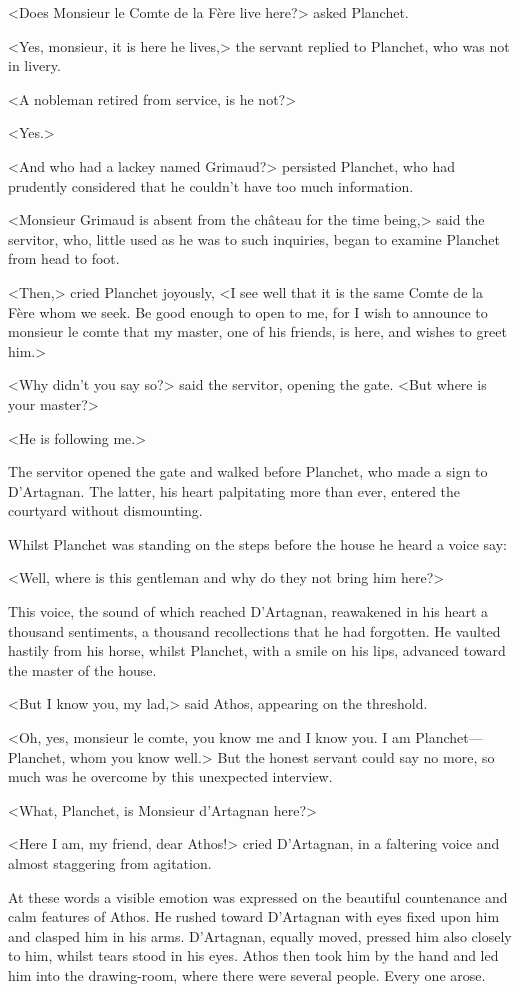 <Does Monsieur le Comte de la Fère live here?> asked Planchet.

<Yes, monsieur, it is here he lives,> the servant replied to Planchet, who was not in livery.

<A nobleman retired from service, is he not?>

<Yes.>

<And who had a lackey named Grimaud?> persisted Planchet, who had prudently considered that he couldn't have too much information.

<Monsieur Grimaud is absent from the château for the time being,> said the servitor, who, little used as he was to such inquiries, began to examine Planchet from head to foot.

<Then,> cried Planchet joyously, <I see well that it is the same Comte de la Fère whom we seek. Be good enough to open to me, for I wish to announce to monsieur le comte that my master, one of his friends, is here, and wishes to greet him.>

<Why didn't you say so?> said the servitor, opening the gate. <But where is your master?>

<He is following me.>

The servitor opened the gate and walked before Planchet, who made a sign to D'Artagnan. The latter, his heart palpitating more than ever, entered the courtyard without dismounting.

Whilst Planchet was standing on the steps before the house he heard a voice say:

<Well, where is this gentleman and why do they not bring him here?>

This voice, the sound of which reached D'Artagnan, reawakened in his heart a thousand sentiments, a thousand recollections that he had forgotten. He vaulted hastily from his horse, whilst Planchet, with a smile on his lips, advanced toward the master of the house.

<But I know you, my lad,> said Athos, appearing on the threshold.

<Oh, yes, monsieur le comte, you know me and I know you. I am Planchet—Planchet, whom you know well.> But the honest servant could say no more, so much was he overcome by this unexpected interview.

<What, Planchet, is Monsieur d'Artagnan here?>

<Here I am, my friend, dear Athos!> cried D'Artagnan, in a faltering voice and almost staggering from agitation.

At these words a visible emotion was expressed on the beautiful countenance and calm features of Athos. He rushed toward D'Artagnan with eyes fixed upon him and clasped him in his arms. D'Artagnan, equally moved, pressed him also closely to him, whilst tears stood in his eyes. Athos then took him by the hand and led him into the drawing-room, where there were several people. Every one arose.

